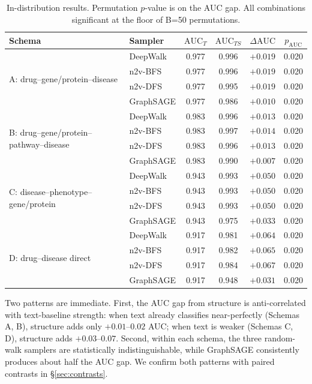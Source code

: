 \documentclass[11pt]{article}
\begin{document}
\begin{table}[h!]
\centering
\caption{In-distribution results. Permutation $p$-value is on the AUC gap. All combinations significant at the floor of B=50 permutations.}
\label{tab:in-dist}
\small
\begin{tabular}{l l c c c c}
\toprule
Schema & Sampler & $\mathrm{AUC}_T$ & $\mathrm{AUC}_{TS}$ & $\Delta\mathrm{AUC}$ & $p_{\mathrm{AUC}}$ \\
\midrule
\multirow{4}{*}{A: drug--gene/protein--disease}
& DeepWalk     & 0.977 & 0.996 & $+0.019$ & 0.020 \\
& n2v-BFS      & 0.977 & 0.996 & $+0.019$ & 0.020 \\
& n2v-DFS      & 0.977 & 0.995 & $+0.019$ & 0.020 \\
& GraphSAGE    & 0.977 & 0.986 & $+0.010$ & 0.020 \\
\midrule
\multirow{4}{*}{B: drug--gene/protein--pathway--disease}
& DeepWalk     & 0.983 & 0.996 & $+0.013$ & 0.020 \\
& n2v-BFS      & 0.983 & 0.997 & $+0.014$ & 0.020 \\
& n2v-DFS      & 0.983 & 0.996 & $+0.013$ & 0.020 \\
& GraphSAGE    & 0.983 & 0.990 & $+0.007$ & 0.020 \\
\midrule
\multirow{4}{*}{C: disease--phenotype--gene/protein}
& DeepWalk     & 0.943 & 0.993 & $+0.050$ & 0.020 \\
& n2v-BFS      & 0.943 & 0.993 & $+0.050$ & 0.020 \\
& n2v-DFS      & 0.943 & 0.993 & $+0.050$ & 0.020 \\
& GraphSAGE    & 0.943 & 0.975 & $+0.033$ & 0.020 \\
\midrule
\multirow{4}{*}{D: drug--disease direct}
& DeepWalk     & 0.917 & 0.981 & $+0.064$ & 0.020 \\
& n2v-BFS      & 0.917 & 0.982 & $+0.065$ & 0.020 \\
& n2v-DFS      & 0.917 & 0.984 & $+0.067$ & 0.020 \\
& GraphSAGE    & 0.917 & 0.948 & $+0.031$ & 0.020 \\
\bottomrule
\end{tabular}
\end{table}

Two patterns are immediate. First, the AUC gap from structure is anti-correlated with text-baseline strength: when text already classifies near-perfectly (Schemas A, B), structure adds only $+0.01$--$0.02$ AUC; when text is weaker (Schemas C, D), structure adds $+0.03$--$0.07$. Second, within each schema, the three random-walk samplers are statistically indistinguishable, while GraphSAGE consistently produces about half the AUC gap. We confirm both patterns with paired contrasts in \S\ref{sec:contrasts}.
\end{document}
